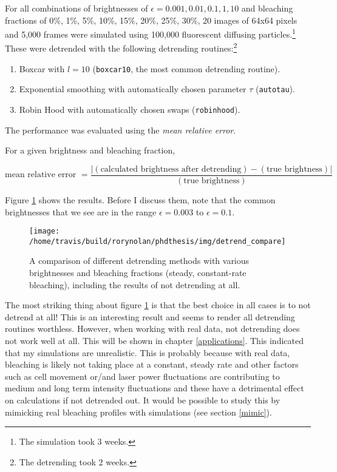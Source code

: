 \documentclass[12pt,]{book}
\providecommand{\tightlist}{%
  \setlength{\itemsep}{0pt}\setlength{\parskip}{0pt}}
\let\rmarkdownfootnote\footnote%
\def\footnote{\protect\rmarkdownfootnote}
\theoremstyle{definition}
\theoremstyle{definition}
\theoremstyle{definition}
\theoremstyle{remark}
\let\BeginKnitrBlock\begin \let\EndKnitrBlock\end
\begin{document}
For all combinations of brightnesses of
\(\epsilon = 0.001, 0.01, 0.1, 1, 10\) and bleaching fractions of 0\%,
1\%, 5\%, 10\%, 15\%, 20\%, 25\%, 30\%, 20 images of 64x64 pixels and
5,000 frames were simulated using 100,000 fluorescent diffusing
particles.\footnote{The simulation took 3 weeks.} These were detrended
with the following detrending routines:\footnote{The detrending took 2
  weeks.}

\begin{enumerate}
\def\labelenumi{\arabic{enumi}.}
\tightlist
\item
  Boxcar with \(l = 10\) (\texttt{boxcar10}, the most common detrending
  routine).
\item
  Exponential smoothing with automatically chosen parameter \(\tau\)
  (\texttt{autotau}).
\item
  Robin Hood with automatically chosen swaps (\texttt{robinhood}).
\end{enumerate}

The performance was evaluated using the \emph{mean relative error}.

\BeginKnitrBlock{definition}
\protect\hypertarget{def:unnamed-chunk-36}{}{\label{def:unnamed-chunk-36} }
For a given brightness and bleaching fraction,

\begin{equation}
\text{mean relative error } = \frac{|(\text{calculated brightness after detrending}) - (\text{true brightness})|}{(\text{true brightness})}
\label{eq:mean-relative-error}
\end{equation}
\EndKnitrBlock{definition}

Figure \ref{fig:detrend-compare} shows the results. Before I discuss
them, note that the common brightnesses that we see are in the range
\(\epsilon = 0.003\) to \(\epsilon = 0.1\).






\begin{figure}

\texttt{[image: /home/travis/build/rorynolan/phdthesis/img/detrend\_compare]} \hfill{}

\caption{A comparison of different detrending
methods with various brightnesses and bleaching fractions (steady,
constant-rate bleaching), including the results of not detrending at
all.}\label{fig:detrend-compare}
\end{figure}

The most striking thing about figure \ref{fig:detrend-compare} is that
the best choice in all cases is to not detrend at all! This is an
interesting result and seems to render all detrending routines
worthless. However, when working with real data, not detrending does not
work well at all. This will be shown in chapter \ref{applications}. This
indicated that my simulations are unrealistic. This is probably because
with real data, bleaching is likely not taking place at a constant,
steady rate and other factors such as cell movement or/and laser power
fluctuations are contributing to medium and long term intensity
fluctuations and these have a detrimental effect on calculations if not
detrended out. It would be possible to study this by mimicking real
bleaching profiles with simulations (see section \ref{mimic}).
\end{document}
